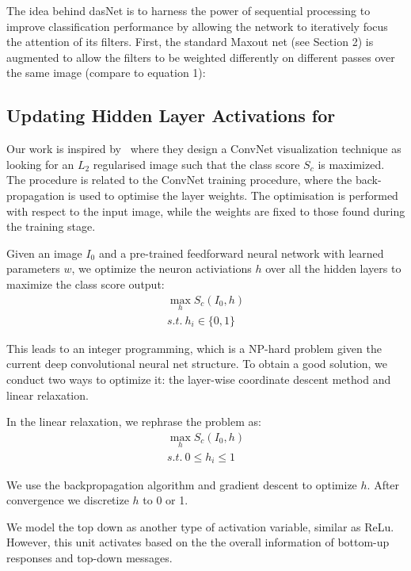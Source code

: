 The idea behind dasNet is to harness the power of sequential processing to improve classification performance by allowing the network to iteratively focus the attention of its filters. First, the standard Maxout net (see Section 2) is augmented to allow the filters to be weighted differently on different passes over the same image (compare to equation 1):


\subsection{Updating Hidden Layer Activations for }
Our work is inspired by~\cite{xxx} where they design a ConvNet visualization technique as looking for an $L_2$ regularised image such that the class score $S_c$ is maximized. The procedure is related to the ConvNet training procedure, where the back-propagation is used to optimise the layer weights. The optimisation is performed with respect to the input image, while the weights are fixed to those found during the training stage.

Given an image $I_0$ and a pre-trained feedforward neural network with learned parameters $w$, we optimize the neuron activiations $h$ over all the hidden layers to maximize the class score output:
\begin{equation}
\begin{aligned}
  \max_h S_c(I_0, h) \\
  s.t.\ h_i \in \{0, 1\}
\end{aligned}
\end{equation}

This leads to an integer programming, which is a NP-hard problem given the current deep convolutional neural net structure. To obtain a good solution, we conduct two ways to optimize it: the layer-wise coordinate descent method and linear relaxation.

In the linear relaxation, we rephrase the problem as:
\begin{equation}
\begin{aligned}
  \max_h S_c(I_0, h) \\
  s.t.\ 0 \leq h_i \leq 1
\end{aligned}
\end{equation}

We use the backpropagation algorithm and gradient descent to optimize $h$. After convergence we discretize $h$ to 0 or 1.

We model the top down as another type of activation variable, similar as ReLu. However, this unit activates based on the the overall information of bottom-up responses and top-down messages. 

